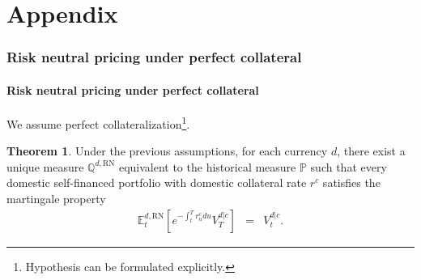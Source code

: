 \documentclass[11pt,english]{amsart}
\newcommand{\RN}{\mathrm{RN}}
\newcommand{\EE}{\mathbb{E}}
\newcommand{\PP}{\mathbb{P}}
\newcommand{\QQ}{\mathbb{Q}}
\theoremstyle{definition}
\newtheorem{theo}{Theorem}
\begin{document}
\newpage%


\appendix 
\part*{Appendix}

\section{Risk neutral pricing under perfect collateral}%

\subsection{Risk neutral pricing under perfect collateral}%

We assume perfect collateralization\footnote{Hypothesis can be formulated explicitly.}.

\begin{theo}
Under the previous assumptions, for each currency $d$, there exist a unique measure $\QQ^{d,\RN}$ equivalent to the historical measure $\PP$ such that every domestic self-financed portfolio with domestic collateral rate $r^c$ satisfies the martingale property
\begin{eqnarray}
	\EE^{d,\RN}_t\left[ e^{-\int_t^T r^c_u du} V^{d|c}_T \right] &=& V^{d|c}_t.
\end{eqnarray} 
\end{theo}
\end{document}
